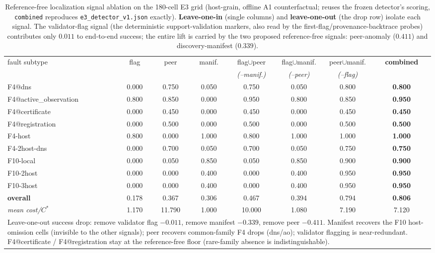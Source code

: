 \begin{table}[t]\centering\small
\caption{Reference-free localization signal ablation on the 180-cell E3 grid (host-grain, offline A1 counterfactual; reuses the frozen detector's scoring, \texttt{combined} reproduces \texttt{e3\_detector\_v1.json} exactly). \textbf{Leave-one-in} (single columns) and \textbf{leave-one-out} (the drop row) isolate each signal. The validator-flag signal (the deterministic support-validation markers, also read by the first-flag/provenance-backtrace probes) contributes only $0.011$ to end-to-end success; the entire lift is carried by the two proposed reference-free signals: peer-anomaly ($0.411$) and discovery-manifest ($0.339$).}
\label{tab:loc-ablation}
\begin{tabular}{lccccccc}\toprule
fault subtype & flag & peer & manif. & flag$\cup$peer & flag$\cup$manif. & peer$\cup$manif. & \textbf{combined}\\
 & & & & \emph{(--manif.)} & \emph{(--peer)} & \emph{(--flag)} & \\\midrule
F4@dns & 0.000 & 0.750 & 0.050 & 0.750 & 0.050 & 0.800 & \textbf{0.800}\\
F4@active\_observation & 0.800 & 0.850 & 0.000 & 0.950 & 0.800 & 0.850 & \textbf{0.950}\\
F4@certificate & 0.000 & 0.450 & 0.000 & 0.450 & 0.000 & 0.450 & \textbf{0.450}\\
F4@registration & 0.000 & 0.500 & 0.000 & 0.500 & 0.000 & 0.500 & \textbf{0.500}\\
F4-host & 0.800 & 0.000 & 1.000 & 0.800 & 1.000 & 1.000 & \textbf{1.000}\\
F4-2host-dns & 0.000 & 0.700 & 0.050 & 0.700 & 0.050 & 0.750 & \textbf{0.750}\\
F10-local & 0.000 & 0.050 & 0.850 & 0.050 & 0.850 & 0.900 & \textbf{0.900}\\
F10-2host & 0.000 & 0.000 & 0.400 & 0.000 & 0.400 & 0.950 & \textbf{0.950}\\
F10-3host & 0.000 & 0.000 & 0.400 & 0.000 & 0.400 & 0.950 & \textbf{0.950}\\
\midrule
\textbf{overall} & 0.178 & 0.367 & 0.306 & 0.467 & 0.394 & 0.794 & \textbf{0.806}\\
\emph{mean cost/$C^*$} & 1.170 & 11.790 & 1.000 & 10.000 & 1.080 & 7.190 & 7.120\\
\midrule
\multicolumn{8}{p{.97\linewidth}}{\footnotesize Leave-one-out success drop: remove validator flag $-0.011$, remove manifest $-0.339$, remove peer $-0.411$. Manifest recovers the F10 host-omission cells (invisible to the other signals); peer recovers common-family F4 drops (dns/ao); validator flagging is near-redundant. F4@certificate / F4@registration stay at the reference-free floor (rare-family absence is indistinguishable).}\\
\bottomrule\end{tabular}\end{table}
